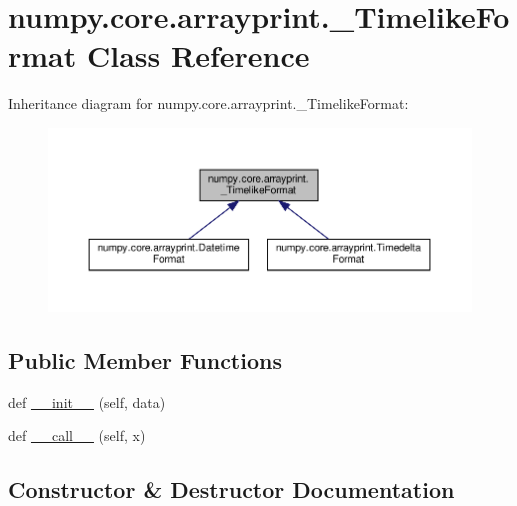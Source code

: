 \hypertarget{classnumpy_1_1core_1_1arrayprint_1_1__TimelikeFormat}{}\section{numpy.\+core.\+arrayprint.\+\_\+\+Timelike\+Format Class Reference}
\label{classnumpy_1_1core_1_1arrayprint_1_1__TimelikeFormat}


Inheritance diagram for numpy.\+core.\+arrayprint.\+\_\+\+Timelike\+Format\+:
\nopagebreak
\begin{figure}[H]
\begin{center}
\leavevmode
\includegraphics[width=350pt]{classnumpy_1_1core_1_1arrayprint_1_1__TimelikeFormat__inherit__graph}
\end{center}
\end{figure}
\subsection*{Public Member Functions}
\begin{DoxyCompactItemize}
\item 
def \hyperlink{classnumpy_1_1core_1_1arrayprint_1_1__TimelikeFormat_a154668c2d405fb82bc1318cf368f726a}{\+\_\+\+\_\+init\+\_\+\+\_\+} (self, data)
\item 
def \hyperlink{classnumpy_1_1core_1_1arrayprint_1_1__TimelikeFormat_a3637ccce50b8d483986c59b60966fff4}{\+\_\+\+\_\+call\+\_\+\+\_\+} (self, x)
\end{DoxyCompactItemize}


\subsection{Constructor \& Destructor Documentation}
\mbox{\label{classnumpy_1_1core_1_1arrayprint_1_1__TimelikeFormat_a154668c2d405fb82bc1318cf368f726a}} 

